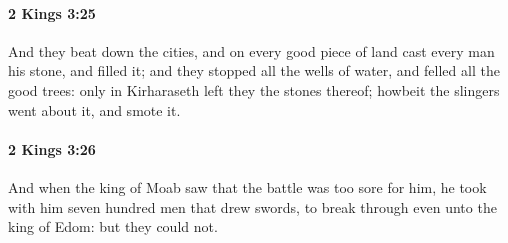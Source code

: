 		\paragraph{2 Kings 3:25} %
			\label{2KINGS-3-25}

			And they beat down the cities, and on every good piece of land cast every man his stone, and filled it; and they stopped all the wells of water, and felled all the good trees: only in Kirharaseth left they the stones thereof; howbeit the slingers went about it, and smote it.


		\paragraph{2 Kings 3:26} %
			\label{2KINGS-3-26}

			And when the king of Moab saw that the battle was too sore for him, he took with him seven hundred men that drew swords, to break through even unto the king of Edom: but they could not.

